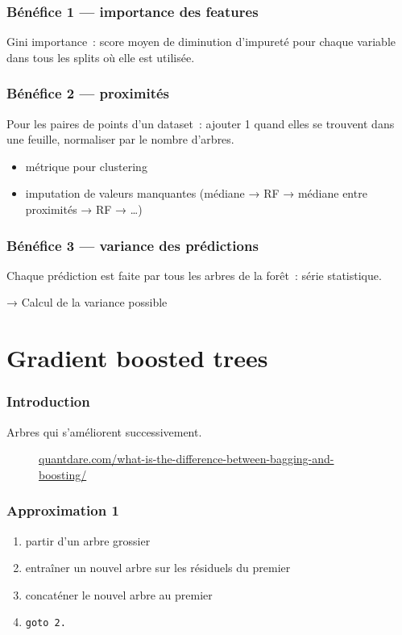 \documentclass{formation}
\begin{document}
\begin{frame}
  \frametitle{Bénéfice 1 — importance des features}

  Gini importance : score moyen de diminution d'impureté pour chaque
  variable dans tous les splits où elle est utilisée.
\end{frame}

\begin{frame}
  \frametitle{Bénéfice 2 — proximités}

  Pour les paires de points d'un dataset : ajouter 1 quand elles se
  trouvent dans une feuille, normaliser par le nombre d'arbres.

  \begin{itemize}
  \item métrique pour clustering
  \item imputation de valeurs manquantes (médiane → RF → médiane entre
    proximités → RF → …)
  \end{itemize}
\end{frame}

\begin{frame}
  \frametitle{Bénéfice 3 — variance des prédictions}

  Chaque prédiction est faite par tous les arbres de la forêt : série
  statistique.

  → Calcul de la variance possible
\end{frame}

\section{Gradient boosted trees}

\begin{frame}
  \frametitle{Introduction}

  Arbres qui s'améliorent successivement.
  \begin{figure}
    \centering {}
    \scriptsize{\href{https://quantdare.com/what-is-the-difference-between-bagging-and-boosting/}%
        {quantdare.com/what-is-the-difference-between-bagging-and-boosting/}}
  \end{figure}
\end{frame}

\begin{frame}
  \frametitle{Approximation 1}

  \begin{enumerate}
  \item partir d'un arbre grossier
  \item entraîner un nouvel arbre sur les résiduels du premier
  \item concaténer le nouvel arbre au premier
  \item \texttt{goto 2.}
  \end{enumerate}

\end{frame}
\end{document}
